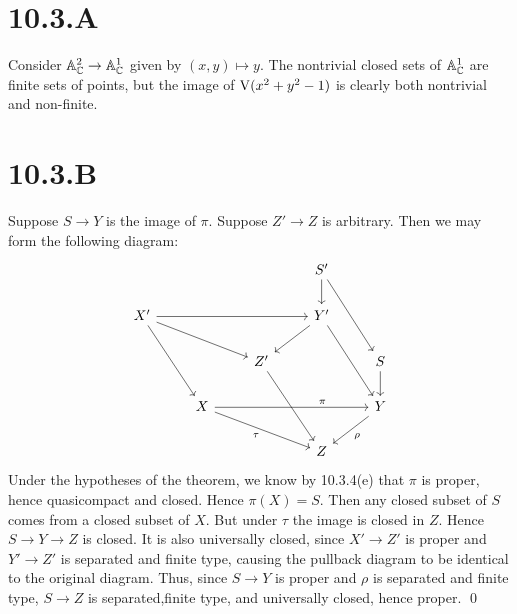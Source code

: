 \documentclass{article}
\begin{document}
\section{10.3.A}
Consider $\mathbb{A}^2_{\mathbb{C}} \to \mathbb{A}^1_{\mathbb{C}}$ given by $(x,y) \mapsto y$. The
nontrivial closed sets of $\mathbb{A}^1_{\mathbb{C}}$ are finite sets of points,
but the image of $\operatorname{V}(x^2+y^2-1)$ is clearly both nontrivial and
non-finite.

\section{10.3.B}
Suppose $S \to Y$ is the image of $\pi$.
Suppose $Z' \to Z$ is arbitrary. Then we may form the following
diagram: \[\begin{tikzcd}
         &   &      & {S'}     \\{X'} &&& {Y'} \\
         &   & {Z'} & {}   & S \\
         & X &      &      & Y \\
         &   &      & Z
        \arrow["\pi"{pos=0.7}, from=4-2, to=4-5]
        \arrow["\tau"', from=4-2, to=5-4]
        \arrow["\rho", from=4-5, to=5-4]
        \arrow[from=3-5, to=4-5]
        \arrow[from=1-4, to=3-5]
        \arrow[from=2-4, to=4-5]
        \arrow[from=1-4, to=2-4]
        \arrow[from=2-1, to=4-2]
        \arrow[from=2-1, to=2-4]
        \arrow[from=2-1, to=3-3]
        \arrow[from=2-4, to=3-3]
        \arrow[from=3-3, to=5-4]
    \end{tikzcd}\] Under the hypotheses of the theorem, we know
by 10.3.4(e) that $\pi$ is proper, hence quasicompact and
closed. Hence $\pi(X)=S$. Then any closed subset of
$S$ comes from a closed subset of $X$.
But under $\tau$ the image is closed in
$Z$. Hence $S \to Y \to Z$ is closed. It is also
universally closed, since $X' \to Z'$ is proper and
$Y' \to Z'$ is separated and finite type, causing the pullback
diagram to be identical to the original diagram. Thus, since
$S \to Y$ is proper and $\rho$ is separated and
finite type, $S \to Z$ is separated,finite type, and universally
closed, hence proper. \qed
\end{document}
